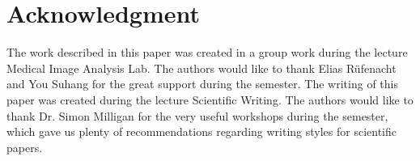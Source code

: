 \documentclass[journal]{IEEEtran}
\begin{document}

%

\appendices




\section*{Acknowledgment}

The work described in this paper was created in a group work during the lecture Medical Image Analysis Lab. The authors would like to thank Elias R\"ufenacht and You Suhang for the great support during the semester. The writing of this paper was created during the lecture Scientific Writing. The authors would like to thank Dr. Simon Milligan for the very useful workshops during the semester, which gave us plenty of recommendations regarding writing styles for scientific papers.



\newpage
\onecolumn
\end{document}
